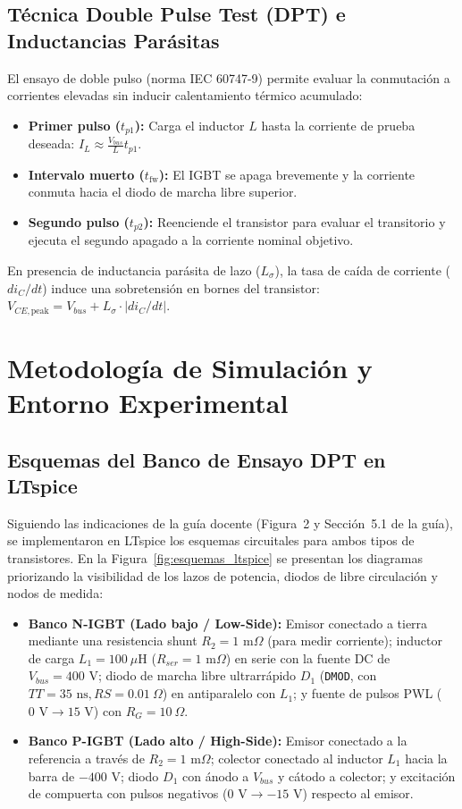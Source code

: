 \documentclass[11pt,a4paper]{article}
\begin{document}
\subsection{Técnica Double Pulse Test (DPT) e Inductancias Parásitas}
El ensayo de doble pulso (norma IEC 60747-9) permite evaluar la conmutación a corrientes elevadas sin inducir calentamiento térmico acumulado:
\begin{itemize}[leftmargin=*, noitemsep, topsep=2pt]
  \item \textbf{Primer pulso ($t_{p1}$):} Carga el inductor $L$ hasta la corriente de prueba deseada: $I_{L} \approx \frac{V_{bus}}{L} t_{p1}$.
  \item \textbf{Intervalo muerto ($t_{\text{fw}}$):} El IGBT se apaga brevemente y la corriente conmuta hacia el diodo de marcha libre superior.
  \item \textbf{Segundo pulso ($t_{p2}$):} Reenciende el transistor para evaluar el transitorio y ejecuta el segundo apagado a la corriente nominal objetivo.
\end{itemize}
En presencia de inductancia parásita de lazo ($L_\sigma$), la tasa de caída de corriente ($di_C/dt$) induce una sobretensión en bornes del transistor: $V_{CE,\text{peak}} = V_{bus} + L_\sigma \cdot |di_C/dt|$.

\section{Metodología de Simulación y Entorno Experimental}

\subsection{Esquemas del Banco de Ensayo DPT en LTspice}
Siguiendo las indicaciones de la guía docente (Figura~2 y Sección~5.1 de la guía), se implementaron en LTspice los esquemas circuitales para ambos tipos de transistores. En la Figura~\ref{fig:esquemas_ltspice} se presentan los diagramas priorizando la visibilidad de los lazos de potencia, diodos de libre circulación y nodos de medida:
\begin{itemize}[leftmargin=*, noitemsep, topsep=2pt]
  \item \textbf{Banco N-IGBT (Lado bajo / Low-Side):} Emisor conectado a tierra mediante una resistencia shunt $R_2 = 1\text{ m}\Omega$ (para medir corriente); inductor de carga $L_1 = 100\ \mu\text{H}$ ($R_{ser} = 1\text{ m}\Omega$) en serie con la fuente DC de $V_{bus} = 400\text{ V}$; diodo de marcha libre ultrarrápido $D_1$ (\texttt{DMOD}, con $TT = 35\text{ ns}, RS = 0.01\ \Omega$) en antiparalelo con $L_1$; y fuente de pulsos PWL ($0\text{ V} \to 15\text{ V}$) con $R_G = 10\ \Omega$.
  \item \textbf{Banco P-IGBT (Lado alto / High-Side):} Emisor conectado a la referencia a través de $R_2 = 1\text{ m}\Omega$; colector conectado al inductor $L_1$ hacia la barra de $-400\text{ V}$; diodo $D_1$ con ánodo a $V_{bus}$ y cátodo a colector; y excitación de compuerta con pulsos negativos ($0\text{ V} \to -15\text{ V}$) respecto al emisor.
\end{itemize}
\end{document}
